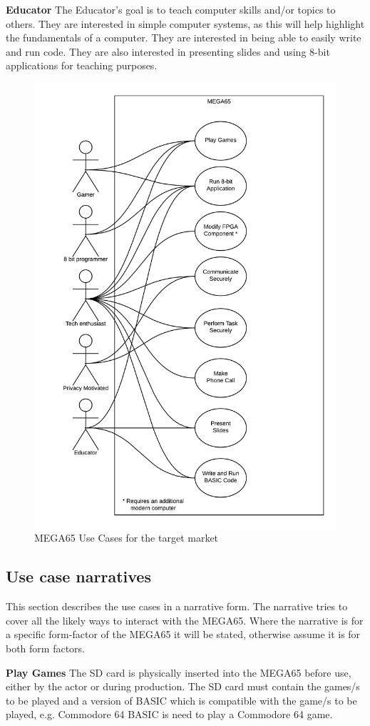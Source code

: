 \textbf{Educator}
The Educator's goal is to teach computer skills and/or topics to others. They are interested in simple computer systems, as this will help highlight the fundamentals of a computer. They are interested in being able to easily write and run code. They are also interested in presenting slides and using 8-bit applications for teaching purposes.

\begin{figure} \begin{center}
\includegraphics[width=.6\linewidth]{pics/MEGA65_use_case} 
\end{center} 
\caption{MEGA65 Use Cases for the target market\\}
\label{MEGA65_use_cases}
\end{figure}

\subsection{Use case narratives}
This section describes the use cases in a narrative form. The narrative tries to cover all the likely ways to interact with the MEGA65. Where the narrative is for a specific form-factor of the MEGA65 it will be stated, otherwise assume it is for both form factors. 

\textbf{Play Games}
The SD card is physically inserted into the MEGA65 before use, either by the actor or during production. The SD card must contain the games/s to be played and a version of BASIC which is compatible with the game/s to be played, e.g. Commodore 64 BASIC is need to play a Commodore 64 game.

